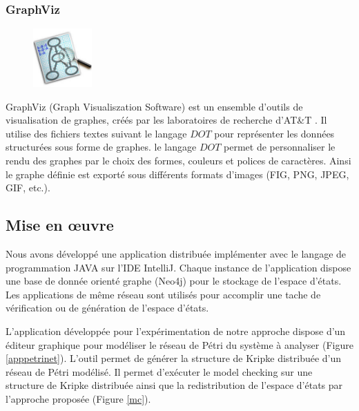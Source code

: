 \subsubsection*{GraphViz}
\begin{figure}
	\vspace{-50pt}
	\begin{center}
		\includegraphics[width=0.2\textwidth]{img/graphviz}
	\end{center}  
\vspace{-20pt}
\vspace{-10pt}  
\end{figure}
GraphViz (Graph Visualiszation Software) est un ensemble d'outils de visualisation de graphes, créés par les laboratoires de recherche d'AT\&T \citep{graphivz}. Il utilise des fichiers textes suivant le langage $DOT$ pour représenter les données structurées sous forme de graphes. le langage $DOT$ permet  de personnaliser le rendu des graphes par le choix des formes, couleurs et polices de caractères. Ainsi le graphe définie est exporté sous différents formats d'images (FIG, PNG, JPEG, GIF, etc.).

\subsection{Mise en œuvre}
Nous avons développé une application distribuée  implémenter avec le langage de programmation JAVA sur l'IDE IntelliJ. Chaque instance de l'application dispose une base de donnée orienté graphe (Neo4j) pour le stockage de l'espace d'états. Les applications de même réseau sont utilisés pour accomplir une tache de vérification ou de génération de l'espace d'états.

L'application développée pour l'expérimentation de notre approche dispose d’un éditeur graphique pour modéliser le réseau de Pétri du système à analyser (Figure \ref{apppetrinet}). L'outil permet de générer la structure de Kripke distribuée d'un réseau de Pétri modélisé. Il permet  d'exécuter  le model checking sur une structure de Kripke distribuée ainsi que la redistribution de l'espace d'états par l'approche proposée (Figure \ref{mc}).


